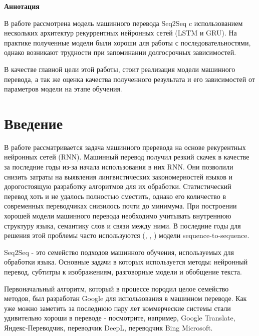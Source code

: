 



	
	

	\begin{center}
	    \textbf{Аннотация}
	\end{center}
	
	В работе рассмотрена модель машинного перевода Seq2Seq c использованием нескольких архитектур рекуррентных нейронных сетей (LSTM и GRU). На практике полученные модели были хороши для работы с последовательностями, однако возникают трудности при запоминании долгосрочных зависимостей.
	
	В качестве главной цели этой работы, стоит реализация модели машинного перевода, а так же оценка качества полученного результата и его зависимостей от параметров модели на этапе обучения.
	
	\clearpage
	
	\section{Введение}
	
	В работе рассматривается задача машинного преревода на основе рекурентных нейронных сетей (RNN). Машинный перевод получил резкий скачек в качестве за последние годы из-за начала использования в них RNN. Они позволили снизить затраты на выявления лингвистических закономерностей языков и дорогостоящую разработку алгоритмов для их обработки. Статистический перевод хоть и не удалось полностью сместить, однако его количество в современных переводчиках снизилось почти до минимума. При построении хорошей модели машинного перевода необходимо учитывать внутреннюю структуру языка, семантику слов и связи между ними. В последние годы для решения этой проблемы часто используются (\cite{10}, \cite{11}, \cite{12}) модели sequence-to-sequence.
	
	Seq2Seq - это семейство подходов машинного обучения, используемых для обработки языка. Основные задачи в которых используется методы: нейронный перевод, субтитры к изображениям, разговорные модели и обобщение текста.
	
	Первоначальный алгоритм, который в процессе породил целое семейство методов, был разработан Google для использования в машинном переводе. Как уже можно заметить за последнюю пару лет коммерческие системы стали удивительно хороши в  переводе - посмотрите, например, Google Translate, Яндекс-Переводчик, переводчик DeepL, переводчик Bing Microsoft.
	
